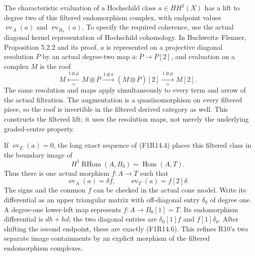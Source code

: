 The characteristic evaluation of a Hochschild class
$a\in HH^2(X)$ has a lift to degree two of this filtered
endomorphism complex, with endpoint values
$\operatorname{ev}_A(a)$ and $\operatorname{ev}_{B_0}(a)$.
To specify the required coherence, use the actual diagonal
kernel representation of Hochschild cohomology. In
Buchweitz--Flenner, Proposition 5.2.2 and its proof,
$a$ is represented on a projective diagonal resolution
$\overline P$ by an actual degree-two map
$\overline a:\overline P\to\overline P[2]$, and evaluation
on a complex $M$ is the roof
\[
 M\xleftarrow[\simeq]{\,1\otimes\overline\mu\,}
 M\otimes\overline P
 \xrightarrow{\,1\otimes\overline a\,}
 (M\otimes\overline P)[2]
 \xrightarrow[\simeq]{\,1\otimes\overline\mu\,}M[2].
 \tag{F1R14.5}
\]
The same resolution and maps apply simultaneously to every
term and arrow of the actual filtration. The augmentation
is a quasiisomorphism on every filtered piece, so the roof
is invertible in the filtered derived category as well.
This constructs the filtered lift; it uses the resolution
maps, not merely the underlying graded-centre property.

If $\operatorname{ev}_E(a)=0$, the long exact sequence of
(F1R14.4) places this filtered class in the boundary image of
\[
 H^1\operatorname{RHom}(A,B_0)
                         =\operatorname{Hom}(A,T).
\]
Thus there is one actual morphism $f:A\to T$ such that
\[
          \operatorname{ev}_A(a)=\delta f,\qquad
          \operatorname{ev}_T(a)=f[2]\delta.
 \tag{F1R14.6}
\]
The signs and the common $f$ can be checked in the actual
cone model. Write its differential as an upper triangular
matrix with off-diagonal entry $\delta_0$ of degree one.
A degree-one lower-left map represents $f:A\to B_0[1]=T$.
Its endomorphism differential is $d h+h d$; the two diagonal
entries are $\delta_0[1]f$ and $f[1]\delta_0$. After
shifting the second endpoint, these are exactly (F1R14.6).
This refines R10's two separate image containments by an
explicit morphism of the filtered endomorphism complexes.

